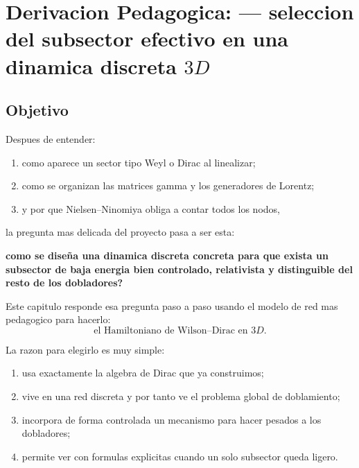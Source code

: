 \chapter{Derivacion Pedagogica: --- seleccion del subsector efectivo en una dinamica discreta \(3D\)}
\label{ch:subsector-efectivo-3d}







\section{Objetivo}
Despues de entender:
\begin{enumerate}[label=\arabic*.]
    \item como aparece un sector tipo Weyl o Dirac al linealizar;
    \item como se organizan las matrices gamma y los generadores de Lorentz;
    \item y por que Nielsen--Ninomiya obliga a contar todos los nodos,
\end{enumerate}
la pregunta mas delicada del proyecto pasa a ser esta:
\begin{displayquote}
\textbf{como se dise\~na una dinamica discreta concreta para que exista un subsector de baja energia bien controlado, relativista y distinguible del resto de los dobladores?}
\end{displayquote}

Este capitulo responde esa pregunta paso a paso usando el modelo de red mas pedagogico para hacerlo:
\begin{equation}
\text{el Hamiltoniano de Wilson--Dirac en \(3D\)}.
\end{equation}

La razon para elegirlo es muy simple:
\begin{enumerate}[label=\arabic*.]
    \item usa exactamente la algebra de Dirac que ya construimos;
    \item vive en una red discreta y por tanto ve el problema global de doblamiento;
    \item incorpora de forma controlada un mecanismo para hacer pesados a los dobladores;
    \item permite ver con formulas explicitas cuando un solo subsector queda ligero.
\end{enumerate}

